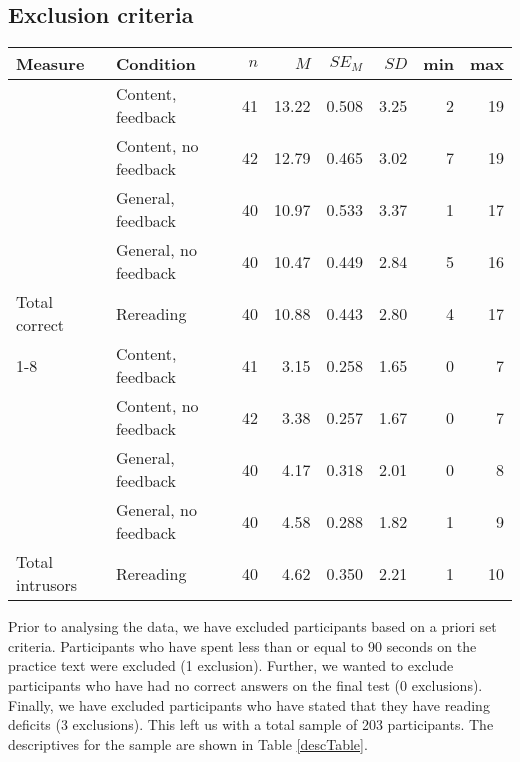 \documentclass[../main.tex]{subfiles}
\begin{document}
\hypertarget{exclusion-criteria}{%
\subsection{Exclusion criteria}\label{exclusion-criteria}}

\begin{table*}[t]

\caption{\label{tab:descTable}\label{descTable}Descriptive statistics for the DVs broken down
                     by experimental condition.}
\centering
\begin{tabular}{llrrrrrr}
\toprule
Measure & Condition & $n$ & $M$ & $SE_M$ & $SD$ & min & max\\
\midrule
 & Content, feedback & 41 & 13.22 & 0.508 & 3.25 & 2 & 19\\

 & Content, no feedback & 42 & 12.79 & 0.465 & 3.02 & 7 & 19\\

 & General, feedback & 40 & 10.97 & 0.533 & 3.37 & 1 & 17\\

 & General, no feedback & 40 & 10.47 & 0.449 & 2.84 & 5 & 16\\

\multirow{-5}{*}{\raggedright\arraybackslash Total correct} & Rereading & 40 & 10.88 & 0.443 & 2.80 & 4 & 17\\
\cmidrule{1-8}
 & Content, feedback & 41 & 3.15 & 0.258 & 1.65 & 0 & 7\\

 & Content, no feedback & 42 & 3.38 & 0.257 & 1.67 & 0 & 7\\

 & General, feedback & 40 & 4.17 & 0.318 & 2.01 & 0 & 8\\

 & General, no feedback & 40 & 4.58 & 0.288 & 1.82 & 1 & 9\\

\multirow{-5}{*}{\raggedright\arraybackslash Total intrusors} & Rereading & 40 & 4.62 & 0.350 & 2.21 & 1 & 10\\
\bottomrule
\end{tabular}
\end{table*}

Prior to analysing the data, we have excluded participants based on a
priori set criteria. Participants who have spent less than or equal to
90 seconds on the practice text were excluded (1 exclusion). Further, we
wanted to exclude participants who have had no correct answers on the
final test (0 exclusions). Finally, we have excluded participants who
have stated that they have reading deficits (3 exclusions). This left us
with a total sample of 203 participants. The descriptives for the sample
are shown in Table \ref{descTable}.
\end{document}
